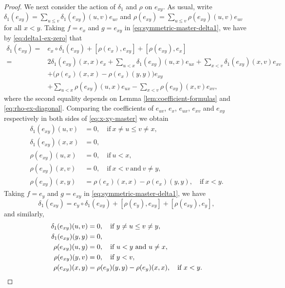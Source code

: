 \documentclass[reqno]{amsart}
\numberwithin{equation}{section}
\theoremstyle{plain}
\theoremstyle{definition}
\begin{document}
\begin{proof}
We next consider the action of $\delta_1$ and $\rho$ on $e_{xy}$. As usual, write
$\delta_1(e_{xy})=\sum_{u\leq v}\delta_1(e_{xy})(u,v)e_{uv}$ and
$\rho(e_{xy})=\sum_{u\leq v}\rho(e_{xy})(u,v)e_{uv}$ for all $x<y$.
Taking $f=e_x$ and $g=e_{xy}$ in \eqref{eq:symmetric-master-delta1}, we have by \eqref{eq:delta1-ex-zero} that
\begin{align}
\delta_1(e_{xy})=& e_x\circ\delta_1(e_{xy})+[\rho(e_x),e_{xy}]+[\rho(e_{xy}),e_x]\nonumber\\
=& 2\delta_1(e_{xy})(x,x)e_x+\sum_{u<x}\delta_1(e_{xy})(u,x)e_{ux}+\sum_{x<v}\delta_1(e_{xy})(x,v)e_{xv}\nonumber\\
&+\bigl(\rho(e_x)(x,x)-\rho(e_x)(y,y)\bigr)e_{xy}\nonumber\\
&+\sum_{u<x}\rho(e_{xy})(u,x)e_{ux}-\sum_{x<v}\rho(e_{xy})(x,v)e_{xv},\label{eq:x-xy-master}
\end{align}
where the second equality depends on Lemma \ref{lem:coefficient-formulas} and \eqref{eq:rho-ex-diagonal}.
Comparing the coefficients of $e_{uv}$, $e_{x}$, $e_{ux}$, $e_{xv}$ and $e_{xy}$ respectively in both sides of \eqref{eq:x-xy-master}
we obtain
\begin{align}
\delta_1(e_{xy})(u,v)&=0,\quad \text{if}~x\neq u\leq v\neq x,\label{eq:b-support-x}\\
\delta_1(e_{xy})(x,x)&=0,\quad  \label{eq:b-xx-zero}\\
\rho(e_{xy})(u,x)&=0,\quad \text{if}~u<x,\label{eq:ccccc1} \\
\rho(e_{xy})(x,v)&=0,\quad \text{if}~x<v~\text{and}~v\neq y,\label{eq:c-ux-zero}\\
\rho(e_{xy})(x,y)&=\rho(e_x)(x,x)-\rho(e_x)(y,y),\quad  \text{if}~x<y.
\label{eq:c-xy-alpha-x}
\end{align}
Taking $f=e_y$ and $g=e_{xy}$ in \eqref{eq:symmetric-master-delta1}, we have
\[
\delta_1(e_{xy})
=e_y\circ\delta_1(e_{xy})
+[\rho(e_y),e_{xy}]
+[\rho(e_{xy}),e_y],
\]
and similarly,
\begin{align}
\delta_1(e_{xy})(u,v)&=0,\quad \text{if}~y\neq u\leq v\neq y,\label{eq:b-support-y}\\
\delta_1(e_{xy})(y,y)&=0,\quad \label{eq:b-yy-zero}\\
\rho(e_{xy})(u,y)&=0,\quad \text{if}~u<y~\text{and}~u\neq x,\label{eq:c-yv-zero}\\
\rho(e_{xy})(y,v)&=0,\quad \text{if}~y<v,\notag \\
\rho(e_{xy})(x,y)&=\rho(e_y)(y,y)-\rho(e_y)(x,x),\quad\text{if}~x<y.
\label{eq:c-xy-alpha-y}
\end{align}

\end{proof}
\end{document}
